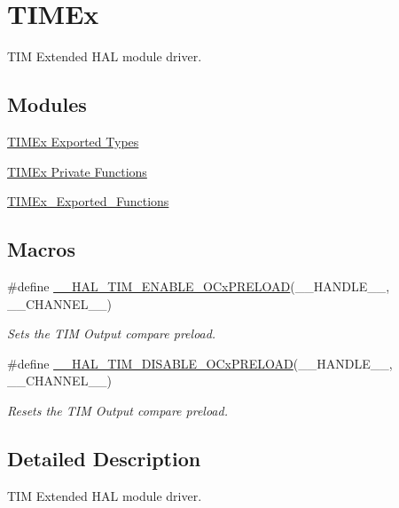 \hypertarget{group___t_i_m_ex}{}\section{T\+I\+M\+Ex}
\label{group___t_i_m_ex}


T\+IM Extended H\+AL module driver.  


\subsection*{Modules}
\begin{DoxyCompactItemize}
\item 
\hyperlink{group___t_i_m_ex___exported___types}{T\+I\+M\+Ex Exported Types}
\item 
\hyperlink{group___t_i_m_ex___private___functions}{T\+I\+M\+Ex Private Functions}
\item 
\hyperlink{group___t_i_m_ex___exported___functions}{T\+I\+M\+Ex\+\_\+\+Exported\+\_\+\+Functions}
\end{DoxyCompactItemize}
\subsection*{Macros}
\begin{DoxyCompactItemize}
\item 
\#define \hyperlink{group___t_i_m_ex_ga199e848f0a301987a500faea0db2dd70}{\+\_\+\+\_\+\+H\+A\+L\+\_\+\+T\+I\+M\+\_\+\+E\+N\+A\+B\+L\+E\+\_\+\+O\+Cx\+P\+R\+E\+L\+O\+AD}(\+\_\+\+\_\+\+H\+A\+N\+D\+L\+E\+\_\+\+\_\+,  \+\_\+\+\_\+\+C\+H\+A\+N\+N\+E\+L\+\_\+\+\_\+)
\begin{DoxyCompactList}\small\item\em Sets the T\+IM Output compare preload. \end{DoxyCompactList}\item 
\#define \hyperlink{group___t_i_m_ex_ga3e0ec4eb797b54c408a3be067f41a2f8}{\+\_\+\+\_\+\+H\+A\+L\+\_\+\+T\+I\+M\+\_\+\+D\+I\+S\+A\+B\+L\+E\+\_\+\+O\+Cx\+P\+R\+E\+L\+O\+AD}(\+\_\+\+\_\+\+H\+A\+N\+D\+L\+E\+\_\+\+\_\+,  \+\_\+\+\_\+\+C\+H\+A\+N\+N\+E\+L\+\_\+\+\_\+)
\begin{DoxyCompactList}\small\item\em Resets the T\+IM Output compare preload. \end{DoxyCompactList}\end{DoxyCompactItemize}


\subsection{Detailed Description}
T\+IM Extended H\+AL module driver. 



